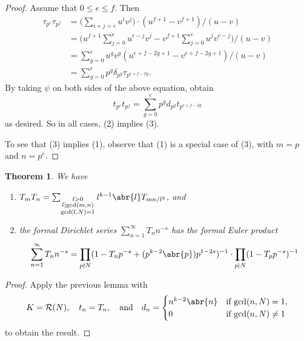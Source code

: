 \documentclass[10pt,leqno,twoside]{article}
\theoremstyle{plain}
\newtheorem{theorem}[lem]{Theorem}
\theoremstyle{definition}
\numberwithin{equation}{section}
\numberwithin{lem}{section}
\begin{document}
\begin{proof}
    Assume that $0\leq e\leq f$. Then \begin{align*}
        \tau_{p^e}\tau_{p^f} &= \bigg(\sum_{i+j=e}u^iv^j\bigg)\cdot (u^{f+1}-v^{f+1})/(u-v)\\
        &= \bigg(u^{f+1}\sum_{j=0}^eu^{e-j}v^j - v^{f+1}\sum_{j=0}^eu^{j}v^{e-j}\bigg)\bigg/(u-v)\\
        &=\sum_{g=0}^e u^gv^g(u^{e+f-2g+1}-v^{e+f-2g+1})/(u-v)\\
        &=\sum_{g=0}^e p^g\delta_{p^g}\tau_{p^{e+f-2g}}.
    \end{align*}
    By taking $\psi$ on both sides of the above equation, obtain \[t_{p^e}t_{p^f} = \sum_{g=0}^ep^gd_{p^g}t_{p^{e+f-2g}}\] as desired. So in all cases, (2) implies (3).

    To see that (3) implies (1), observe that (1) is a special case of (3), with $m = p$ and $n = p^e$.
\end{proof}
\begin{theorem}\label{thm: miyake thm 4.5.13}
    We have \begin{enumerate}[label=\textup{(\arabic*)}]
        \item $T_mT_n = \sum_{\substack{l>0 \\ l\mid \gcd(m,n)\\ \gcd(l,N)=1}}l^{k-1}\abr{l}T_{mn/l^2}$, and
        \item the formal Dirichlet series $\sum_{n=1}^\infty T_nn^{-s}$ has the formal Euler product \[\sum_{n=1}^\infty T_nn^{-s} = \prod_{p\nmid N}(1-T_np^{-s} + (p^{k-2}\abr{p})p^{1-2s})^{-1}\cdot \prod_{p\mid N}(1-T_pp^{-s})^{-1}\]
    \end{enumerate}
\end{theorem}
\begin{proof}
    Apply the previous lemma with 
    \[K = \mathcal R(N),\quad t_n = T_n,\quad \text{and}\quad d_n =\begin{cases}
        n^{k-2}\abr{n} & \text{if $\gcd(n,N) = 1$},\\
        0 & \text{if $\gcd(n,N)\neq 1$}
    \end{cases}\] to obtain the result.
\end{proof}
\end{document}
